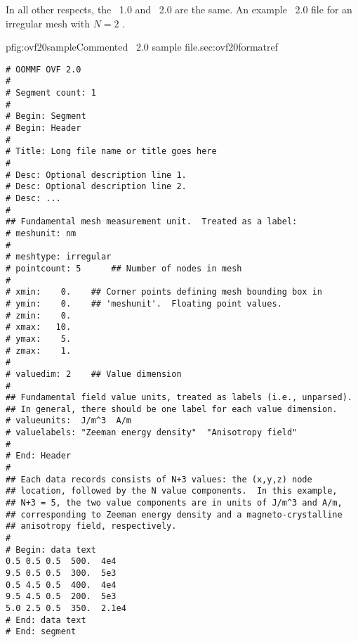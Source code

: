 In all other respects, the \OVF~1.0 and \OVF~2.0 are the same.  An
example \OVF~2.0 file for an irregular mesh with $N=2$
.

\begin{codelisting}{p}{fig:ovf20sample}{Commented \OVF~2.0 sample
  file.}{sec:ovf20format}{ref}
\begin{verbatim}
# OOMMF OVF 2.0
#
# Segment count: 1
#
# Begin: Segment
# Begin: Header
#
# Title: Long file name or title goes here
#
# Desc: Optional description line 1.
# Desc: Optional description line 2.
# Desc: ...
#
## Fundamental mesh measurement unit.  Treated as a label:
# meshunit: nm
#
# meshtype: irregular
# pointcount: 5      ## Number of nodes in mesh
#
# xmin:    0.    ## Corner points defining mesh bounding box in
# ymin:    0.    ## 'meshunit'.  Floating point values.
# zmin:    0.
# xmax:   10.
# ymax:    5.
# zmax:    1.
#
# valuedim: 2    ## Value dimension
#
## Fundamental field value units, treated as labels (i.e., unparsed).
## In general, there should be one label for each value dimension.
# valueunits:  J/m^3  A/m
# valuelabels: "Zeeman energy density"  "Anisotropy field"
#
# End: Header
#
## Each data records consists of N+3 values: the (x,y,z) node
## location, followed by the N value components.  In this example,
## N+3 = 5, the two value components are in units of J/m^3 and A/m,
## corresponding to Zeeman energy density and a magneto-crystalline
## anisotropy field, respectively.
#
# Begin: data text
0.5 0.5 0.5  500.  4e4
9.5 0.5 0.5  300.  5e3
0.5 4.5 0.5  400.  4e4
9.5 4.5 0.5  200.  5e3
5.0 2.5 0.5  350.  2.1e4
# End: data text
# End: segment
\end{verbatim}
\end{codelisting}



